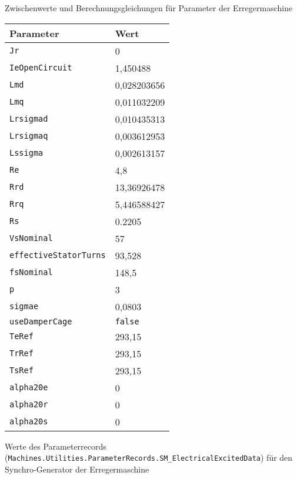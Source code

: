 Zwischenwerte und Berechnungsgleichungen für Parameter der
Erregermaschine

\begin{longtable}[]{@{}ll@{}}
\toprule
Parameter & Wert\tabularnewline
\midrule
\endhead
\texttt{Jr} & 0\tabularnewline
\texttt{IeOpenCircuit} & 1,450488\tabularnewline
\texttt{Lmd} & 0,028203656\tabularnewline
\texttt{Lmq} & 0,011032209\tabularnewline
\texttt{Lrsigmad} & 0,010435313\tabularnewline
\texttt{Lrsigmaq} & 0,003612953\tabularnewline
\texttt{Lssigma} & 0,002613157\tabularnewline
\texttt{Re} & 4,8\tabularnewline
\texttt{Rrd} & 13,36926478\tabularnewline
\texttt{Rrq} & 5,446588427\tabularnewline
\texttt{Rs} & 0.2205\tabularnewline
\texttt{VsNominal} & 57\tabularnewline
\texttt{effectiveStatorTurns} & 93,528\tabularnewline
\texttt{fsNominal} & 148,5\tabularnewline
\texttt{p} & 3\tabularnewline
\texttt{sigmae} & 0,0803\tabularnewline
\texttt{useDamperCage} & \texttt{false}\tabularnewline
\texttt{TeRef} & 293,15\tabularnewline
\texttt{TrRef} & 293,15\tabularnewline
\texttt{TsRef} & 293,15\tabularnewline
\texttt{alpha20e} & 0\tabularnewline
\texttt{alpha20r} & 0\tabularnewline
\texttt{alpha20s} & 0\tabularnewline
\bottomrule
\end{longtable}

Werte des Parameterrecords
(\texttt{Machines.Utilities.ParameterRecords.SM\_ElectricalExcitedData})
für den Synchro-Generator der Erregermaschine

